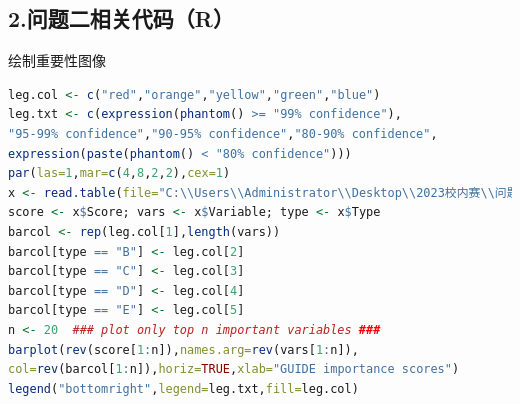 \documentclass{article}
\numberwithin{equation}{subsection}
\begin{document}
\subsection*{2.问题二相关代码（R）}
绘制重要性图像
\begin{lstlisting}[language=R]
leg.col <- c("red","orange","yellow","green","blue")
leg.txt <- c(expression(phantom() >= "99% confidence"),
"95-99% confidence","90-95% confidence","80-90% confidence",
expression(paste(phantom() < "80% confidence")))
par(las=1,mar=c(4,8,2,2),cex=1)
x <- read.table(file="C:\\Users\\Administrator\\Desktop\\2023校内赛\\问题二\\A6\\A6_imp.txt",header=TRUE)
score <- x$Score; vars <- x$Variable; type <- x$Type
barcol <- rep(leg.col[1],length(vars))
barcol[type == "B"] <- leg.col[2]
barcol[type == "C"] <- leg.col[3]
barcol[type == "D"] <- leg.col[4]
barcol[type == "E"] <- leg.col[5]
n <- 20  ### plot only top n important variables ###
barplot(rev(score[1:n]),names.arg=rev(vars[1:n]),
col=rev(barcol[1:n]),horiz=TRUE,xlab="GUIDE importance scores")
legend("bottomright",legend=leg.txt,fill=leg.col)
\end{lstlisting}
\end{document}
